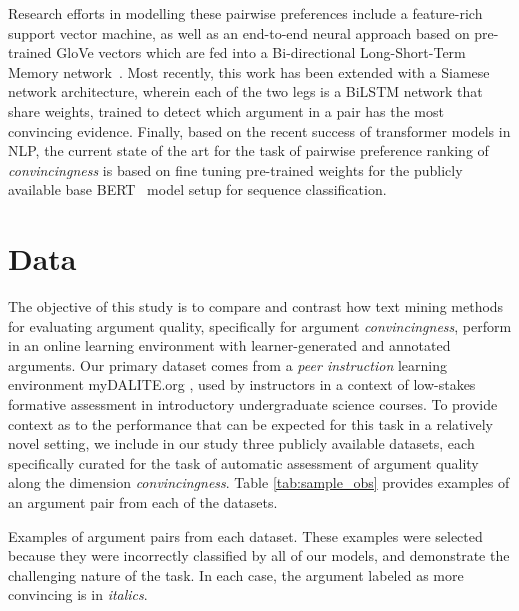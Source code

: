 \documentclass[runningheads]{llncs}
\begin{document}
Research efforts in modelling these pairwise preferences include a feature-rich 
support vector machine, as well as an end-to-end neural approach based on 
pre-trained GloVe vectors\cite{pennington_glove:_2014} which are fed into 
a Bi-directional Long-Short-Term Memory network~\cite{habernal_which_2016}. 
Most recently, this work has been extended with a Siamese network architecture, 
wherein each of the two legs is a BiLSTM network that share weights, 
trained to detect which argument in a pair has the most convincing 
evidence\cite{gleize_are_2019}.
Finally, based on the recent success of transformer models in NLP, the current 
state of the art for the task of pairwise preference ranking of 
\textit{convincingness} is based on fine tuning pre-trained weights for the 
publicly available base BERT~\cite{devlin_bert_2018} model setup for sequence 
classification\cite{toledo_automatic_2019}.


\section{Data}

The objective of this study is to compare and contrast how text 
mining methods for evaluating argument quality, specifically for argument 
\textit{convincingness}, perform in an online learning environment with 
learner-generated and annotated arguments. 
Our primary dataset comes from a \textit{peer instruction} learning 
environment myDALITE.org , used by instructors in a context of low-stakes 
formative assessment in introductory undergraduate science courses.
To provide context as to the performance that can be expected for this 
task in a relatively novel setting, we include in our study three publicly 
available datasets, each specifically curated for the task of automatic 
assessment of argument quality along the dimension \textit{convincingness}. 
Table \ref{tab:sample_obs} provides examples of an argument pair 
from each of the datasets.


\begin{table}
	\caption{Examples of argument pairs from each dataset. These examples were 
	selected because they were incorrectly classified by all of our models, and 
	demonstrate the challenging nature of the task. In each case, the argument 
	labeled as more convincing is in \textit{italics}.}
	\label{tab:sample_obs}
	\begin{subtable}[t]{\textwidth}
	
	\end{subtable}
	\begin{subtable}[t]{\textwidth}
	
	\end{subtable}
	\begin{subtable}[t]{\textwidth}
	
	\end{subtable}
\end{table}
\end{document}
